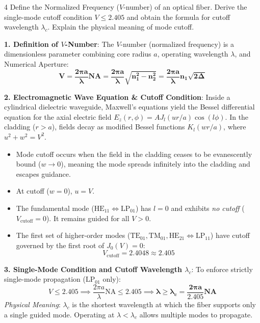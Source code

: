 \vspace{4mm}

\begin{theoryq}{4}
Define the Normalized Frequency ($V$-number) of an optical fiber. Derive the single-mode cutoff condition $V \le 2.405$ and obtain the formula for cutoff wavelength $\lambda_c$. Explain the physical meaning of mode cutoff.
\end{theoryq}
\begin{theorysol}
\textbf{1. Definition of $V$-Number}:
The $V$-number (normalized frequency) is a dimensionless parameter combining core radius $a$, operating wavelength $\lambda$, and Numerical Aperture:
\begin{equation}
\mathbf{V = \frac{2\pi a}{\lambda}\text{NA} = \frac{2\pi a}{\lambda}\sqrt{n_1^2 - n_2^2} = \frac{2\pi a}{\lambda}n_1\sqrt{2\Delta}}
\end{equation}

\textbf{2. Electromagnetic Wave Equation \& Cutoff Condition}:
Inside a cylindrical dielectric waveguide, Maxwell's equations yield the Bessel differential equation for the axial electric field $E_z(r,\phi) = A J_l(ur/a)\cos(l\phi)$.
In the cladding ($r > a$), fields decay as modified Bessel functions $K_l(wr/a)$, where $u^2 + w^2 = V^2$.
\begin{itemize}
    \item Mode cutoff occurs when the field in the cladding ceases to be evanescently bound ($w \to 0$), meaning the mode spreads infinitely into the cladding and escapes guidance.
    \item At cutoff ($w = 0$), $u = V$.
    \item The fundamental mode ($\text{HE}_{11} \iff \text{LP}_{01}$) has $l=0$ and exhibits \textit{no cutoff} ($V_{\text{cutoff}} = 0$). It remains guided for all $V > 0$.
    \item The first set of higher-order modes ($\text{TE}_{01}, \text{TM}_{01}, \text{HE}_{21} \iff \text{LP}_{11}$) have cutoff governed by the first root of $J_0(V) = 0$:
    \begin{equation}
    V_{\text{cutoff}} = 2.4048 \approx \mathbf{2.405}
    \end{equation}
\end{itemize}

\textbf{3. Single-Mode Condition and Cutoff Wavelength $\lambda_c$}:
To enforce strictly single-mode propagation ($\text{LP}_{01}$ only):
\begin{equation}
V \le 2.405 \implies \frac{2\pi a}{\lambda}\text{NA} \le 2.405 \implies \mathbf{\lambda \ge \lambda_c = \frac{2\pi a}{2.405}\text{NA}}
\end{equation}
\textit{Physical Meaning}: $\lambda_c$ is the shortest wavelength at which the fiber supports only a single guided mode. Operating at $\lambda < \lambda_c$ allows multiple modes to propagate.
\end{theorysol}
\vspace{4mm}

